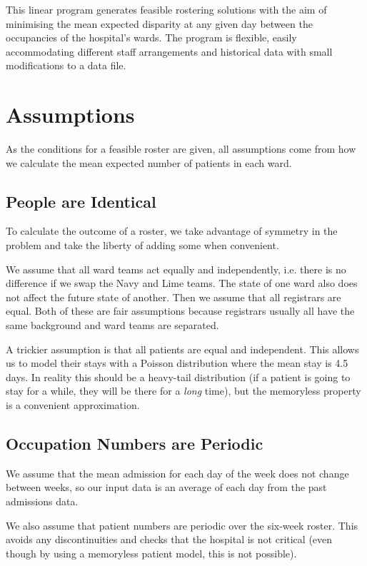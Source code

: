\documentclass[a4paper]{article}
\begin{document}
This linear program generates feasible rostering solutions with the aim of minimising the mean expected disparity at any given day between the occupancies of the hospital's wards. The program is flexible, easily accommodating different staff arrangements and historical data with small modifications to a data file.

\section{Assumptions}

As the conditions for a feasible roster are given, all assumptions come from how we calculate the mean expected number of patients in each ward.

\subsection{People are Identical}

To calculate the outcome of a roster, we take advantage of symmetry in the problem and take the liberty of adding some when convenient.

We assume that all ward teams act equally and independently, i.e. there is no difference if we swap the Navy and Lime teams. The state of one ward also does not affect the future state of another. Then we assume that all registrars are equal. Both of these are fair assumptions because registrars usually all have the same background and ward teams are separated.

A trickier assumption is that all patients are equal and independent. This allows us to model their stays with a Poisson distribution where the mean stay is 4.5 days. In reality this should be a heavy-tail distribution (if a patient is going to stay for a while, they will be there for a \emph{long} time), but the memoryless property is a convenient approximation.

\subsection{Occupation Numbers are Periodic}

We assume that the mean admission for each day of the week does not change between weeks, so our input data is an average of each day from the past admissions data.

We also assume that patient numbers are periodic over the six-week roster. This avoids any discontinuities and checks that the hospital is not critical (even though by using a memoryless patient model, this is not possible).
\end{document}
